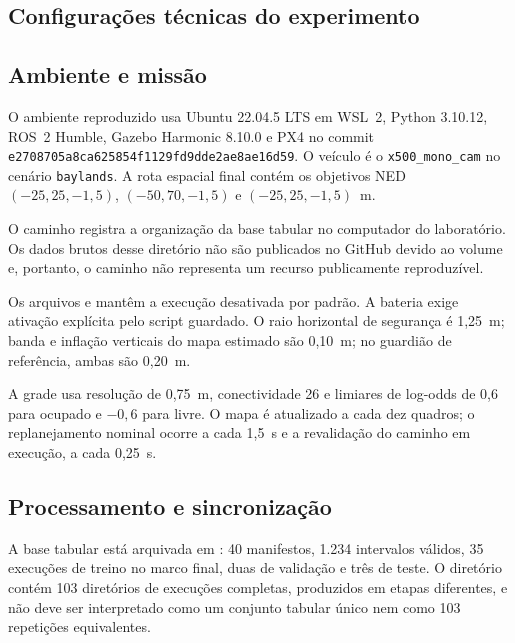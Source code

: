 \begin{apendicesenv}

\partapendices

\chapter[Configurações]{Configurações técnicas do experimento}

\section{Ambiente e missão}

O ambiente reproduzido usa Ubuntu 22.04.5 LTS em WSL~2, Python 3.10.12, ROS~2 Humble, Gazebo Harmonic 8.10.0 e PX4 no commit \texttt{e2708705a8ca625854f1129fd9dde2ae8ae16d59}. O veículo é o \texttt{x500\_mono\_cam} no cenário \texttt{baylands}. A rota espacial final contém os objetivos NED $(-25,25,-1{,}5)$, $(-50,70,-1{,}5)$ e $(-25,25,-1{,}5)$~m.

O caminho  registra a organização da base tabular no computador do laboratório. Os dados brutos desse diretório não são publicados no GitHub devido ao volume e, portanto, o caminho não representa um recurso publicamente reproduzível.

Os arquivos  e  mantêm a execução desativada por padrão. A bateria exige ativação explícita pelo script guardado. O raio horizontal de segurança é 1,25~m; banda e inflação verticais do mapa estimado são 0,10~m; no guardião de referência, ambas são 0,20~m.

A grade usa resolução de 0,75~m, conectividade 26 e limiares de log-odds de 0,6 para ocupado e $-0,6$ para livre. O mapa é atualizado a cada dez quadros; o replanejamento nominal ocorre a cada 1,5~s e a revalidação do caminho em execução, a cada 0,25~s.

\section{Processamento e sincronização}

A base tabular está arquivada em : 40 manifestos, 1.234 intervalos válidos, 35 execuções de treino no marco final, duas de validação e três de teste. O diretório  contém 103 diretórios de execuções completas, produzidos em etapas diferentes, e não deve ser interpretado como um conjunto tabular único nem como 103 repetições equivalentes.


\end{apendicesenv}
